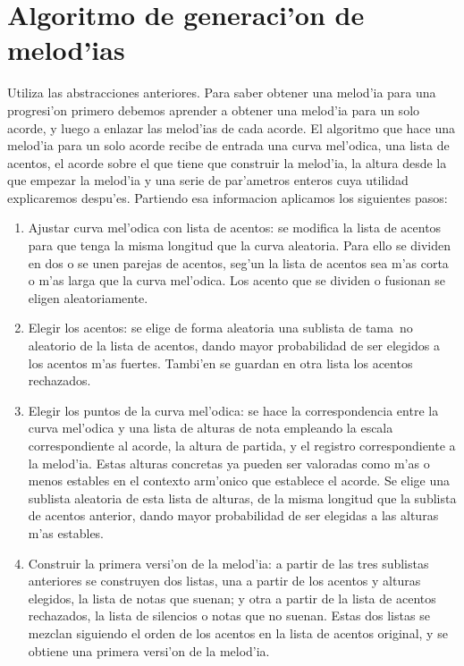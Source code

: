 ﻿\documentclass[a4paper,12pt]{article}
\begin{document}
\section{Algoritmo de generaci'on de melod'ias}
Utiliza las abstracciones anteriores. Para saber obtener una melod'ia para una progresi'on primero debemos aprender a obtener una melod'ia para un solo acorde, y luego a enlazar las melod'ias de cada acorde.
\newline
El algoritmo que hace una melod'ia para un solo acorde recibe de entrada una curva mel'odica, una lista de acentos, el acorde sobre el que tiene que construir la melod'ia, la altura desde la que empezar la melod'ia y una serie de par'ametros enteros cuya utilidad explicaremos despu'es. Partiendo esa informacion aplicamos los siguientes pasos:
        \begin{enumerate}
        \item Ajustar curva mel'odica con lista de acentos: se modifica la lista de acentos para que tenga la misma longitud que la curva aleatoria. Para ello se dividen en dos o se unen parejas de acentos, seg'un la lista de acentos sea m'as corta o m'as larga que la curva mel'odica. Los acento que se dividen o fusionan se eligen aleatoriamente.
        \item Elegir los acentos: se elige de forma aleatoria una sublista de tama~no aleatorio de la lista de acentos, dando mayor probabilidad de ser elegidos a los acentos m'as fuertes. Tambi'en se guardan en otra lista los acentos rechazados.
        \item Elegir los puntos de la curva mel'odica: se hace la correspondencia entre la curva mel'odica y una lista de alturas de nota empleando la escala correspondiente al acorde, la altura de partida, y el registro correspondiente a la melod'ia. Estas alturas concretas ya pueden ser valoradas como m'as o menos estables en el contexto arm'onico que establece el acorde. Se elige una sublista aleatoria de esta lista de alturas, de la misma longitud que la sublista de acentos anterior, dando mayor probabilidad de ser elegidas a las alturas m'as estables.
        \item Construir la primera versi'on de la melod'ia: a partir de las tres sublistas anteriores se construyen dos listas, una a partir de los acentos y alturas elegidos, la lista de notas que suenan; y otra a partir de la lista de acentos rechazados, la lista de silencios o notas que no suenan. Estas dos listas se mezclan siguiendo el orden de los acentos en la lista de acentos original, y se obtiene una primera versi'on de la melod'ia.

\end{enumerate}
\end{document}
